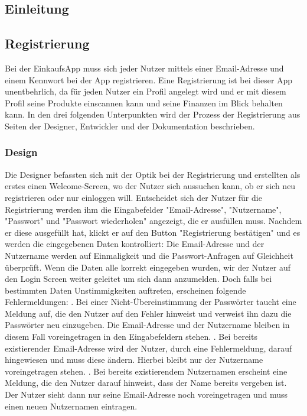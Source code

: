 \documentclass[12pt,a4paper]{article}
\begin{document}
\subsection*{Einleitung}
\newpage
\subsection{Registrierung}
Bei der EinkaufsApp muss sich jeder Nutzer mittels einer Email-Adresse und einem Kennwort bei der App registrieren.
Eine Registrierung ist bei dieser App unentbehrlich, da für jeden Nutzer ein Profil angelegt wird und er mit diesem Profil seine Produkte einscannen kann und seine Finanzen im Blick behalten kann.
In den drei folgenden Unterpunkten wird der Prozess der Registrierung aus Seiten der Designer, Entwickler und der Dokumentation beschrieben.
\subsubsection*{Design}
Die Designer befassten sich mit der Optik bei der Registrierung und erstellten als erstes einen Welcome-Screen, wo der Nutzer sich aussuchen kann, ob er sich neu registrieren oder nur einloggen will. 
Entscheidet sich der Nutzer für die Registrierung werden ihm die Eingabefelder "Email-Adresse", "Nutzername", "Passwort" und "Passwort wiederholen" angezeigt, die er ausfüllen muss.
Nachdem er diese ausgefüllt hat, klickt er auf den Button "Registrierung bestätigen" und es werden die eingegebenen Daten kontrolliert: Die Email-Adresse und der Nutzername werden auf Einmaligkeit und die Passwort-Anfragen auf Gleichheit überprüft.
Wenn die Daten alle korrekt eingegeben wurden, wir der Nutzer auf den Login Screen weiter geleitet um sich dann anzumelden.
Doch falls bei bestimmten Daten Unstimmigkeiten auftreten, erscheinen folgende Fehlermeldungen:
. Bei einer Nicht-Übereinstimmung der Passwörter taucht eine Meldung auf, die den Nutzer auf den Fehler hinweist und verweist ihn dazu die Passwörter neu einzugeben. Die Email-Adresse und der Nutzername bleiben in diesem Fall voreingetragen in den Eingabefeldern stehen.
. Bei bereits existierender Email-Adresse wird der Nutzer, durch eine Fehlermeldung, darauf hingewiesen und muss diese ändern. Hierbei bleibt nur der Nutzername voreingetragen stehen.
. Bei bereits existierendem Nutzernamen erscheint eine Meldung, die den Nutzer darauf hinweist, dass der Name bereits vergeben ist. Der Nutzer sieht dann nur seine Email-Adresse noch voreingetragen und muss einen neuen Nutzernamen eintragen.
\end{document}

